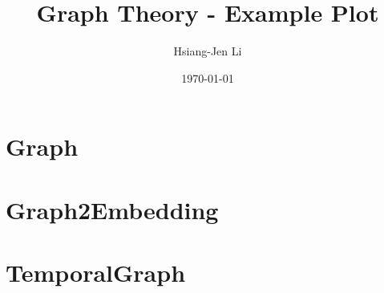 \documentclass[12pt]{article}
\title{Graph Theory - Example Plot }
\author{Hsiang-Jen Li}
\date{\today}
\begin{document}
    \maketitle
    \newpage

    \section{Graph}
    
    
    \section{Graph2Embedding}
    

    \section{TemporalGraph}
\end{document}
